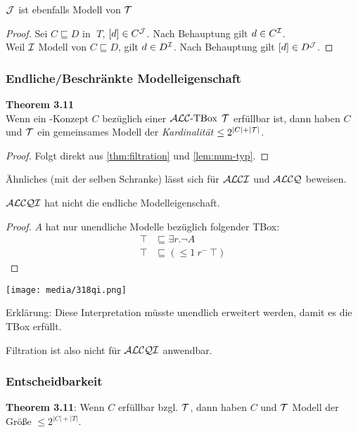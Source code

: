 \begin{tafel}
$\mathcal{J}$ ist ebenfalls Modell von $\mathcal{T}$
\begin{proof}
Sei $C \sqsubseteq D$ in $\;T$, $[d] \in C^{\mathcal{J}}$.
Nach Behauptung gilt $d \in C^{\mathcal{I}}$. \\
Weil $\mathcal{I}$ Modell von $C \sqsubseteq D$, gilt $d \in D^{\mathcal{I}}$.
Nach Behauptung gilt $[d] \in D^{\mathcal{J}}$.
\end{proof}
\end{tafel}

\subsubsection{Endliche/Beschränkte Modelleigenschaft}

\textbf{Theorem 3.11} \\
Wenn ein \ALC-Konzept $C$ bezüglich einer $\text{\ensuremath{\mathcal{A}\mathcal{L}\mathcal{C}}-TBox}$ $\mathcal{T}$ erfüllbar ist, dann haben $C$ und $\mathcal{T}$ ein gemeinsames Modell der
\emph{Kardinalität} $\leq 2^{\left| C \right| + |\MT|}$.

\begin{proof}
    Folgt direkt aus \autoref{thm:filtration} und \autoref{lem:num-typ}.
\end{proof}

Ähnliches (mit der selben Schranke) lässt sich für $\mathcal{A}\mathcal{L}\mathcal{C}\mathcal{I}$ und $\mathcal{A}\mathcal{L}\mathcal{C}\mathcal{Q}$ beweisen.

\begin{theorem}
$\mathcal{A}\mathcal{L}\mathcal{C}\mathcal{Q}\mathcal{I}$ hat nicht die endliche Modelleigenschaft.
\end{theorem}

\begin{proof}
    $A$ hat nur unendliche Modelle bezüglich folgender TBox:
    \begin{align*}
        \top &\sqsubseteq \exists r.\neg A\\
        \top &\sqsubseteq ( \leq 1\ r^{-}\ \top)
    \end{align*}
\end{proof}
\begin{tafel}\mbox{}

\texttt{[image: media/318qi.png]}

Erklärung: Diese Interpretation müsste unendlich erweitert werden, damit es die TBox erfüllt.
\end{tafel}

Filtration ist also nicht für $\mathcal{A}\mathcal{L}\mathcal{C}\mathcal{Q}\mathcal{I}$ anwendbar.

\subsubsection{Entscheidbarkeit}
\textbf{Theorem 3.11}:
Wenn $C$ erfüllbar bzgl. $\mathcal{T}$, dann haben $C$ und $\mathcal{T}$ Modell der
Größe $\leq 2^{\left| C \right| + \left| T \right|}$.

